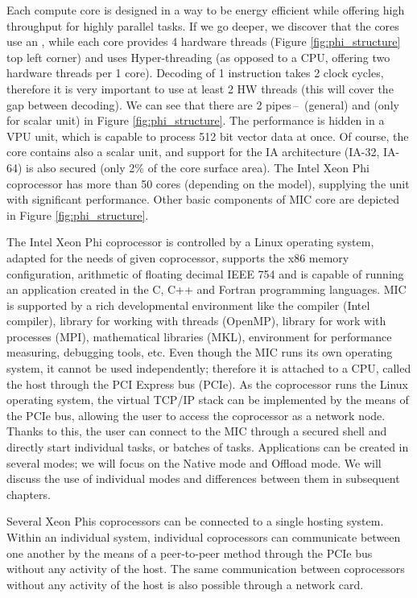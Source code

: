 \par Each compute core is designed in a way to be energy efficient while offering high throughput for highly parallel tasks. If we go deeper, we discover that the cores use an , while each core provides 4 hardware threads (Figure \ref{fig:phi_structure} top left corner) and uses Hyper-threading (as opposed to a CPU, offering two hardware threads per 1 core). Decoding of 1 instruction takes 2 clock cycles, therefore it is very important to use at least 2 HW threads (this will cover the gap between decoding). We can see that there are 2 pipes\,--\, (general) and  (only for scalar unit) in Figure \ref{fig:phi_structure}. The performance is hidden in a VPU unit, which is capable to process 512 bit vector data at once. Of course, the core contains also a scalar unit, and support for the IA architecture (IA-32, IA-64) is also secured (only 2\% of the core surface area). The Intel Xeon Phi coprocessor has more than 50 cores (depending on the model), supplying the unit with significant performance. Other basic components of MIC core are depicted in Figure \ref{fig:phi_structure}. 

\par The Intel Xeon Phi coprocessor is controlled by a Linux operating system, adapted for the needs of given coprocessor, supports the x86 memory configuration, arithmetic of floating decimal IEEE 754 and is capable of running an application created in the C, C++ and Fortran programming languages. MIC is supported by a rich developmental environment like the compiler (Intel compiler), library for working with threads (OpenMP), library for work with processes (MPI), mathematical libraries (MKL), environment for performance measuring, debugging tools, etc. 
Even though the MIC runs its own operating system, it cannot be used independently; therefore it is attached to a CPU, called the host through the PCI Express bus (PCIe). As the coprocessor runs the Linux operating system, the virtual TCP/IP stack can be implemented by the means of the PCIe bus, allowing the user to access the coprocessor as a network node. Thanks to this, the user can connect to the MIC through a secured shell and directly start individual tasks, or batches of tasks. Applications can be created in several modes; we will focus on the Native mode and Offload mode. We will discuss the use of individual modes and differences between them in subsequent chapters.

\par Several Xeon Phis coprocessors can be connected to a single hosting system. Within an individual system, individual coprocessors can communicate between one another by the means of a peer-to-peer method through the PCIe bus without any activity of the host. The same communication between coprocessors without any activity of the host is also possible through a network card.

